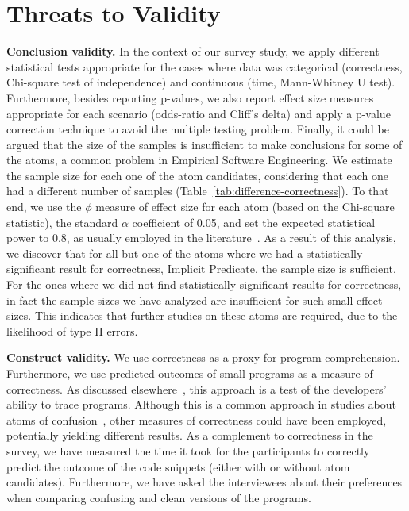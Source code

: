 \section{Threats to Validity}
\label{threat}


\textbf{Conclusion validity.} In the context of our survey study, we apply different statistical tests appropriate for the cases where data was categorical (correctness, Chi-square test of independence) and continuous (time, Mann-Whitney U test). Furthermore, besides reporting p-values, we also report effect size measures appropriate for each scenario (odds-ratio and Cliff's delta) and apply a p-value correction technique to avoid the multiple testing problem. Finally, it could be argued that the size of the samples is insufficient to make conclusions for some of the atoms, a common problem in Empirical Software Engineering. We estimate the sample size for each one of the atom candidates, considering that each one had a different number of samples (Table~\ref{tab:difference-correctness}). To that end, we use the $\phi$ measure of effect size for each atom (based on the Chi-square statistic), the standard $\alpha$ coefficient of 0.05, and set the expected statistical power to 0.8, as usually employed in the literature~\cite{Ellis:2010:EGE}. As a result of this analysis, we discover that for all but one of the atoms where we had a statistically significant result for correctness, Implicit Predicate, the sample size is sufficient. For the ones where we did not find statistically significant results for correctness, in fact the sample sizes we have analyzed are insufficient for such small effect sizes. This indicates that further studies on these atoms are required, due to the likelihood of type II errors.



\textbf{Construct validity.} We use correctness as a proxy for program comprehension. Furthermore, we use predicted outcomes of small programs as a measure of correctness. As discussed elsewhere~\cite{Oliveira:2020:ECR}, this approach is a test of the developers' ability to trace programs. Although this is a common approach in studies about atoms of confusion~\cite{TheEyesDoNotLie,Langhout:2021:ACJ,DBLP:conf/sigsoft/GopsteinIYDZYC17}, other measures of correctness could have been employed, potentially yielding different results. As a complement to correctness in the survey, we have measured the time it took for the participants to correctly predict the outcome of the code snippets (either with or without atom candidates). Furthermore, we have  asked the interviewees about their preferences when comparing confusing and clean versions of the programs.

